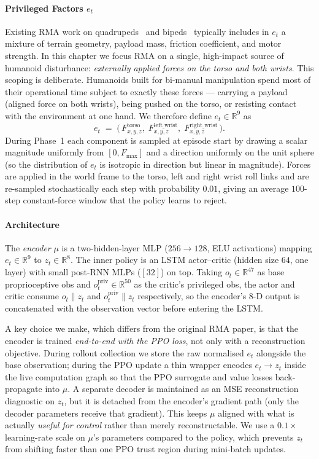 \paragraph{Privileged Factors $e_t$}
\label{sec:rma_et}
Existing RMA work on quadrupeds~\citep{kumar2021rmarapidmotoradaptation} and
bipeds~\citep{kumar2022adaptingrapidmotoradaptation} typically includes in
$e_t$ a mixture of terrain geometry, payload mass, friction coefficient, and
motor strength. In this chapter we focus RMA on a single, high-impact source
of humanoid disturbance: \emph{externally applied forces on the torso and
both wrists}. This scoping is deliberate. Humanoids built for bi-manual
manipulation spend most of their operational time subject to exactly these
forces --- carrying a payload (aligned force on both wrists), being pushed on
the torso, or resisting contact with the environment at one hand. We therefore
define $e_t\in\mathbb{R}^{9}$ as
\[
e_t \;=\; \big(\,F^{\text{torso}}_{x,y,z},\;
                 F^{\text{left\_wrist}}_{x,y,z},\;
                 F^{\text{right\_wrist}}_{x,y,z}\,\big).
\]
During Phase~1 each component is sampled at episode start by drawing a scalar
magnitude uniformly from $[0, F_{\max}]$ and a direction uniformly on the
unit sphere (so the distribution of $e_t$ is isotropic in direction but
linear in magnitude). Forces are applied in the world frame to the torso,
left and right wrist roll links and are re-sampled stochastically each step
with probability $0.01$, giving an average $100$-step constant-force window
that the policy learns to reject.

\paragraph{Architecture}
\label{sec:rma_arch}
The \emph{encoder} $\mu$ is a two-hidden-layer MLP ($256\!\to\!128$,
ELU activations) mapping $e_t\in\mathbb{R}^9$ to $z_t\in\mathbb{R}^8$. The
inner policy is an LSTM actor--critic (hidden size $64$, one layer) with
small post-RNN MLPs ($[32]$) on top. Taking $o_t\in\mathbb{R}^{47}$ as base
proprioceptive obs and $o_t^{\mathrm{priv}}\in\mathbb{R}^{50}$ as the critic's
privileged obs, the actor and critic consume $o_t\|z_t$ and
$o_t^{\mathrm{priv}}\|z_t$ respectively, so the encoder's $8$-D output is
concatenated with the observation vector before entering the LSTM.

A key choice we make, which differs from the original RMA paper, is that the
encoder is trained \emph{end-to-end with the PPO loss}, not only with a
reconstruction objective. During rollout collection we store the raw
normalised $e_t$ alongside the base observation; during the PPO update a
thin wrapper encodes $e_t\!\to\!z_t$ inside the live computation graph so
that the PPO surrogate and value losses back-propagate into $\mu$. A
separate decoder is maintained as an MSE reconstruction diagnostic on
$z_t$, but it is detached from the encoder's gradient path (only the
decoder parameters receive that gradient). This keeps $\mu$ aligned with
what is actually \emph{useful for control} rather than merely reconstructable.
We use a $0.1\times$ learning-rate scale on $\mu$'s parameters compared to
the policy, which prevents $z_t$ from shifting faster than one PPO trust
region during mini-batch updates.


